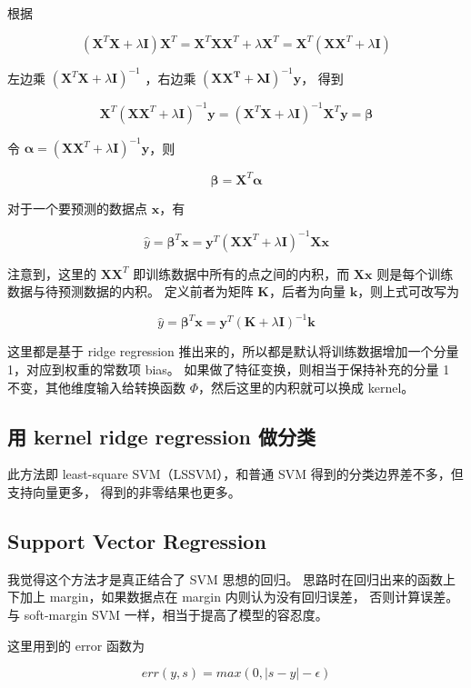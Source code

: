 \documentclass[a4paper]{article}
\begin{document}
根据 

$$(\mathbf{X}^T\mathbf{X} + \lambda\mathbf{I})\mathbf{X}^T = \mathbf{X}^T\mathbf{X}\mathbf{X}^T + \lambda\mathbf{X}^T = \mathbf{X}^T(\mathbf{X}\mathbf{X}^T + \lambda\mathbf{I})$$

左边乘 $(\mathbf{X}^T\mathbf{X} + \lambda\mathbf{I})^{-1}$ ，右边乘 $(\mathbf{XX^T + \lambda\mathbf{I}})^{-1}\mathbf{y}$，
得到

$$\mathbf{X}^T(\mathbf{XX}^T + \lambda\mathbf{I})^{-1}\mathbf{y} = (\mathbf{X}^T\mathbf{X} + \lambda\mathbf{I})^{-1}\mathbf{X}^T\mathbf{y} = \bm{\beta}$$

令 $\bm{\alpha} = (\bm{XX}^T + \lambda\mathbf{I})^{-1}\mathbf{y}$，则

$$\bm{\beta} = \mathbf{X}^T\bm{\alpha}$$

对于一个要预测的数据点 $\mathbf{x}$，有

$$\hat{y} = \bm{\beta}^T\mathbf{x} = \mathbf{y}^T(\mathbf{XX}^T + \lambda\mathbf{I})^{-1}\mathbf{Xx}$$

注意到，这里的 $\mathbf{XX}^T$ 即训练数据中所有的点之间的内积，而 $\mathbf{Xx}$ 则是每个训练数据与待预测数据的内积。
定义前者为矩阵 $\mathbf{K}$，后者为向量 $\mathbf{k}$，则上式可改写为

$$\hat{y} = \bm{\beta}^T\mathbf{x} = \mathbf{y}^T(\mathbf{K} + \lambda\mathbf{I})^{-1}\mathbf{k}$$

这里都是基于 ridge regression 推出来的，所以都是默认将训练数据增加一个分量 1，对应到权重的常数项 bias。
如果做了特征变换，则相当于保持补充的分量 1 不变，其他维度输入给转换函数 $\Phi$，然后这里的内积就可以换成
kernel。


\subsection{用 kernel ridge regression 做分类}
此方法即 least-square SVM（LSSVM），和普通 SVM 得到的分类边界差不多，但支持向量更多，
得到的非零结果也更多。

\subsection{Support Vector Regression}
我觉得这个方法才是真正结合了 SVM 思想的回归。
思路时在回归出来的函数上下加上 margin，如果数据点在 margin 内则认为没有回归误差，
否则计算误差。与 soft-margin SVM 一样，相当于提高了模型的容忍度。

这里用到的 error 函数为

$$err(y, s) = max(0, |s-y| - \epsilon)$$
\end{document}
